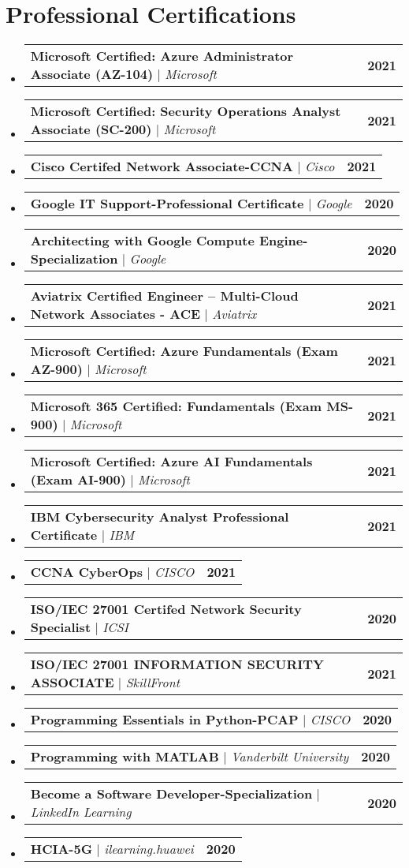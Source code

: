 \documentclass[letterpaper,11pt]{article}
\makeatletter
\newcommand{\resumeProjectHeading}[2]{
    \item
    \begin{tabular*}{1.001\textwidth}{l@{\extracolsep{\fill}}r}
      \small#1 & \textbf{\small #2}\\
    \end{tabular*}\vspace{-7pt}
}
\newcommand{\resumeSubHeadingListStart}{\begin{itemize}[leftmargin=0.0in, label={}]}
\newcommand{\resumeSubHeadingListEnd}{\end{itemize}}
\makeatother
\begin{document}
\section{Professional Certifications}
    \vspace{-5pt}
    \resumeSubHeadingListStart
      \resumeProjectHeading
          {\textbf{Microsoft Certified: Azure Administrator Associate (AZ-104)} $|$ \emph{Microsoft}}{2021}
          \vspace{-13pt}
      \resumeProjectHeading
          {\textbf{Microsoft Certified: Security Operations Analyst Associate (SC-200)} $|$ \emph{Microsoft}}{2021}
          \vspace{-13pt}
      \resumeProjectHeading
          {\textbf{Cisco Certifed Network Associate-CCNA} $|$ \emph{Cisco}}{2021}
          \vspace{-13pt}
      \resumeProjectHeading
          {\textbf{Google IT Support-Professional Certificate} $|$ \emph{Google}}{2020}
          \vspace{-13pt}
      \resumeProjectHeading
          {\textbf{Architecting with Google Compute Engine-Specialization} $|$ \emph{Google}}{2020}
          \vspace{-13pt}
      \resumeProjectHeading
          {\textbf{Aviatrix Certified Engineer – Multi-Cloud Network Associates - ACE} $|$ \emph{Aviatrix}}{2021}
          \vspace{-13pt}
      \resumeProjectHeading
          {\textbf{Microsoft Certified: Azure Fundamentals (Exam AZ-900)} $|$ \emph{Microsoft}}{2021}
          \vspace{-13pt}
      \resumeProjectHeading
          {\textbf{Microsoft 365 Certified: Fundamentals (Exam MS-900)} $|$ \emph{Microsoft}}{2021}
          \vspace{-13pt}
      \resumeProjectHeading
          {\textbf{Microsoft Certified: Azure AI Fundamentals (Exam AI-900)} $|$ \emph{Microsoft}}{2021}
          \vspace{-13pt}
      \resumeProjectHeading
          {\textbf{IBM Cybersecurity Analyst Professional Certificate} $|$ \emph{IBM}}{2021}
          \vspace{-13pt}
      \resumeProjectHeading
          {\textbf{CCNA CyberOps} $|$ \emph{CISCO}}{2021}
          \vspace{-13pt}
      \resumeProjectHeading
          {\textbf{ISO/IEC 27001 Certifed Network Security Specialist} $|$ \emph{ICSI}}{2020}
      \resumeProjectHeading
          {\textbf{ISO/IEC 27001 INFORMATION SECURITY ASSOCIATE} $|$ \emph{SkillFront}}{2021}
      \resumeProjectHeading
          {\textbf{Programming Essentials in Python-PCAP} $|$ \emph{CISCO}}{2020}
      \resumeProjectHeading
          {\textbf{Programming with MATLAB} $|$ \emph{Vanderbilt University}}{2020}
          \vspace{-13pt}
      \resumeProjectHeading
          {\textbf{Become a Software Developer-Specialization} $|$ \emph{LinkedIn Learning}}{2020}
          \vspace{-13pt}
      \resumeProjectHeading
          {\textbf{HCIA-5G} $|$ \emph{ilearning.huawei}}{2020}
          \vspace{-13pt}
    \resumeSubHeadingListEnd
\vspace{-5pt}
\end{document}

